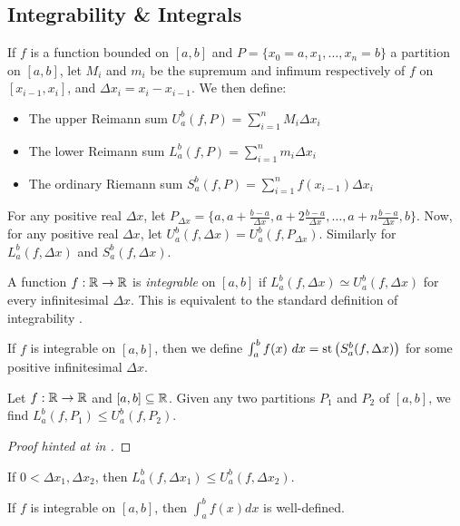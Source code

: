 \subsection{Integrability \& Integrals}
If $f$ is a function bounded on $[a, b]$ and $P = \{x_0 = a, x_1, \ldots, x_n = b\}$ a partition on $[a, b]$, let $M_i$ and $m_i$ be the supremum and infimum respectively of $f$ on $[x_{i-1}, x_i]$, and $\Delta x_i = x_i - x_{i-1}$. We then define:
\begin{itemize}
    \item The upper Reimann sum $U_a^b(f, P) = \sum_{i=1}^n M_i\Delta x_i$
    \item The lower Reimann sum $L_a^b(f, P) =\sum_{i=1}^n m_i\Delta x_i$
    \item The ordinary Riemann sum $S_a^b(f, P) = \sum_{i=1}^n f(x_{i-1})\Delta x_i$
\end{itemize}
For any positive real $\Delta x$, let $P_{\Delta x} = \{a, a+\frac{b-a}{\Delta x}, a + 2\frac{b-a}{\Delta x}, \ldots, a + n\frac{b-a}{\Delta x}, b\}$. Now, for any positive real $\Delta x$, let $U_a^b(f, \Delta x) = U_a^b(f, P_{\Delta x})$. Similarly for $L_a^b(f, \Delta x)$ and $S_a^b(f, \Delta x)$.

A function $f: \mathbb{R} \to \mathbb{R}$ is \textit{integrable} on $[a, b]$ if $L_a^b(f, \Delta x) \simeq U_a^b(f, \Delta x)$ for every infinitesimal $\Delta x$. This is equivalent to the standard definition of integrability \cite[110]{goldblatt1998}.

If $f$ is integrable on $[a, b]$, then we define $\int_a^b f(x)\ dx = \operatorname{st}\left(S_a^b(f, \Delta x)\right)$ for some positive infinitesimal $\Delta x$.

\begin{lemma}
    Let $f: \mathbb{R} \to \mathbb{R}$ and $[a, b] \subseteq \mathbb{R}$. Given any two partitions $P_1$ and $P_2$ of $[a, b]$, we find $L_a^b(f, P_1) \leq U_a^b(f, P_2)$.
\end{lemma}

\begin{proof}[Proof hinted at in \cite{goldblatt1998}]
    
\end{proof}

\begin{corollary}\label{lowerSumsLessThanUpperSumsWithNumbers}
    If $0 < \Delta x_1, \Delta x_2$, then $L_a^b(f, \Delta x_1) \leq U_a^b(f, \Delta x_2)$.
\end{corollary}

\begin{thm}
    If $f$ is integrable on $[a, b]$, then $\int_a^b f(x)dx$ is well-defined.
\end{thm}

